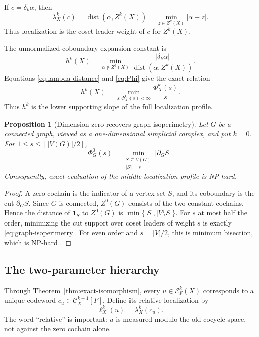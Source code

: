 \documentclass[11pt,letterpaper]{article}
\theoremstyle{plain}
\newtheorem{proposition}[theorem]{Proposition}
\theoremstyle{definition}
\newcommand{\cC}{\mathcal{C}}
\newcommand{\cE}{\mathcal{E}}
\newcommand{\dist}{\operatorname{dist}}
\newcommand{\1}{\mathbf{1}}
\newcommand{\abs}[1]{\left|#1\right|}
\newcommand{\floor}[1]{\left\lfloor#1\right\rfloor}
\begin{document}
If $c=\delta_k\alpha$, then
\begin{equation}\label{eq:lambda-distance}
 \lambda_X^k(c)=\dist(\alpha,Z^k(X))
 =\min_{z\in Z^k(X)}\abs{\alpha+z}.
\end{equation}
Thus localization is the coset-leader weight of $c$ for $Z^k(X)$.

The unnormalized coboundary-expansion constant is
\begin{equation}\label{eq:h-unweighted}
 h^k(X)=\min_{\alpha\notin Z^k(X)}
 \frac{\abs{\delta_k\alpha}}{\dist(\alpha,Z^k(X))}.
\end{equation}
Equations \eqref{eq:lambda-distance} and \eqref{eq:Phi} give the exact relation
\begin{equation}\label{eq:h-profile}
 h^k(X)=\min_{s:\Phi_X^k(s)<\infty}\frac{\Phi_X^k(s)}{s}.
\end{equation}
Thus $h^k$ is the lower supporting slope of the full localization profile.

\begin{proposition}[Dimension zero recovers graph isoperimetry]
\label{prop:graph-profile}
Let $G$ be a connected graph, viewed as a one-dimensional simplicial complex, and put
$k=0$.  For $1\le s\le\floor{\abs{V(G)}/2}$,
\begin{equation}\label{eq:graph-isoperimetry}
 \Phi_G^0(s)=\min_{\substack{S\subseteq V(G)\\\abs{S}=s}}\abs{\partial_G S}.
\end{equation}
Consequently, exact evaluation of the middle localization profile is NP-hard.
\end{proposition}

\begin{proof}
A zero-cochain is the indicator of a vertex set $S$, and its coboundary is the cut
$\partial_G S$.  Since $G$ is connected, $Z^0(G)$ consists of the two constant
cochains.  Hence the distance of $\1_S$ to $Z^0(G)$ is
$\min\{\abs S,\abs{V\setminus S}\}$.  For $s$ at most half the order, minimizing the
cut support over coset leaders of weight $s$ is exactly \eqref{eq:graph-isoperimetry}.
For even order and $s=\abs V/2$, this is minimum bisection, which is NP-hard
\cite{gareyjohnsonstockmeyer1976}.
\end{proof}

\subsection{The two-parameter hierarchy}

Through Theorem~\ref{thm:exact-isomorphism}, every $u\in\cE_F^k(X)$ corresponds to a
unique codeword $c_u\in\cC_X^{k+1}[F]$.  Define its relative localization by
\[
 \ell_X^k(u)=\lambda_X^k(c_u).
\]
The word ``relative'' is important: $u$ is measured modulo the old cocycle space, not
against the zero cochain alone.
\end{document}
